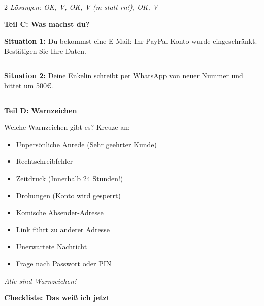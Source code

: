 \documentclass[a4paper,landscape,8pt]{extarticle}
\begin{document}
\begin{multicols}{2}
\textit{\footnotesize Lösungen: OK, V, OK, V (m statt rn!), OK, V}

\vspace{4mm}

\textbf{\large Teil C: Was machst du?}

\vspace{2mm}

\textbf{Situation 1:} Du bekommst eine E-Mail: \glqq Ihr PayPal-Konto wurde eingeschränkt. Bestätigen Sie Ihre Daten.\grqq{}

\rule{7cm}{0.4pt}

\vspace{3mm}

\textbf{Situation 2:} Deine Enkelin schreibt per WhatsApp von neuer Nummer und bittet um 500€.

\rule{7cm}{0.4pt}

\columnbreak

\textbf{\large Teil D: Warnzeichen}

Welche Warnzeichen gibt es? Kreuze an:

\vspace{2mm}

\begin{itemize}[label=$\square$, itemsep=3pt]
\item Unpersönliche Anrede (\glqq Sehr geehrter Kunde\grqq{})
\item Rechtschreibfehler
\item Zeitdruck (\glqq Innerhalb 24 Stunden!\grqq{})
\item Drohungen (\glqq Konto wird gesperrt\grqq{})
\item Komische Absender-Adresse
\item Link führt zu anderer Adresse
\item Unerwartete Nachricht
\item Frage nach Passwort oder PIN
\end{itemize}

\textit{\footnotesize Alle sind Warnzeichen!}

\vspace{4mm}

\textbf{\large Checkliste: Das weiß ich jetzt}

\vspace{2mm}

\begin{center}
\end{center}


\end{multicols}
\end{document}
